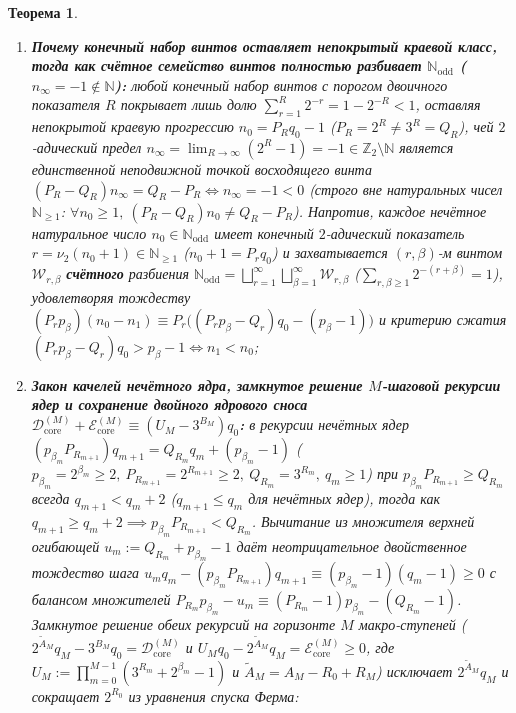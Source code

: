\documentclass[11pt,a4paper]{article}
\newtheorem{theorem}{Теорема}[section]
\theoremstyle{definition}
\theoremstyle{remark}
\begin{document}
\begin{theorem}
\begin{enumerate}[label=\textbf{(\roman*)},leftmargin=*,noitemsep]
  \[
    D_{\mathrm{tot}}\bigl(\mathcal{L}_1\mathbin{++}[(p_\beta,1,0),(P_R,Q_R,Q_R-P_R)]\mathbin{++}\mathcal{L}_2\bigr) - D_{\mathrm{tot}}\bigl(\mathcal{L}_1\mathbin{++}[(P_R,Q_R,Q_R-P_R),(p_\beta,1,0)]\mathbin{++}\mathcal{L}_2\bigr) \;\equiv\; P_{\mathrm{tot}}(\mathcal{L}_1)\cdot(p_\beta-1)(Q_R-P_R)\cdot Q_{\mathrm{tot}}(\mathcal{L}_2);
  \]
\item \textbf{Почему конечный набор винтов оставляет непокрытый краевой класс, тогда как счётное семейство винтов полностью разбивает $\mathbb{N}_{\mathrm{odd}}$ ($n_\infty = -1 \notin \mathbb{N}$):}
  любой конечный набор винтов с порогом двоичного показателя $R$ покрывает лишь долю $\sum_{r=1}^R 2^{-r} = 1 - 2^{-R} < 1$, оставляя непокрытой краевую прогрессию $n_0 = P_R q_0 - 1$ ($P_R = 2^R \ne 3^R = Q_R$), чей $2$-адический предел $n_\infty = \lim_{R\to\infty}(2^R - 1) = -1 \in \mathbb{Z}_2\setminus\mathbb{N}$ является единственной неподвижной точкой восходящего винта $(P_R - Q_R)n_\infty = Q_R - P_R \iff n_\infty = -1 < 0$ (строго вне натуральных чисел $\mathbb{N}_{\ge 1}$: $\forall n_0 \ge 1,\ (P_R - Q_R)n_0 \ne Q_R - P_R$). Напротив, каждое нечётное натуральное число $n_0 \in \mathbb{N}_{\mathrm{odd}}$ имеет конечный $2$-адический показатель $r = \nu_2(n_0 + 1) \in \mathbb{N}_{\ge 1}$ ($n_0 + 1 = P_r q_0$) и захватывается $(r,\beta)$-м винтом $\mathcal{W}_{r,\beta}$ \textbf{счётного} разбиения $\mathbb{N}_{\mathrm{odd}} = \bigsqcup_{r=1}^\infty\bigsqcup_{\beta=1}^\infty \mathcal{W}_{r,\beta}$ ($\sum_{r,\beta\ge 1} 2^{-(r+\beta)} = 1$), удовлетворяя тождеству $(P_r p_\beta)(n_0 - n_1) \equiv P_r\bigl((P_r p_\beta - Q_r)q_0 - (p_\beta - 1)\bigr)$ и критерию сжатия $(P_r p_\beta - Q_r)q_0 > p_\beta - 1 \iff n_1 < n_0$;
\item \textbf{Закон качелей нечётного ядра, замкнутое решение $M$-шаговой рекурсии ядер и сохранение двойного ядрового сноса $\mathcal{D}_{\mathrm{core}}^{(M)} + \mathcal{E}_{\mathrm{core}}^{(M)} \equiv (U_M - 3^{B_M})q_0$:}
  в рекурсии нечётных ядер $(p_{\beta_m} P_{R_{m+1}}) q_{m+1} = Q_{R_m} q_m + (p_{\beta_m} - 1)$ ($p_{\beta_m} = 2^{\beta_m}\ge 2,\ P_{R_{m+1}} = 2^{R_{m+1}}\ge 2,\ Q_{R_m} = 3^{R_m},\ q_m\ge 1$) при $p_{\beta_m} P_{R_{m+1}} \ge Q_{R_m}$ всегда $q_{m+1} < q_m + 2$ ($q_{m+1} \le q_m$ для нечётных ядер), тогда как $q_{m+1} \ge q_m + 2 \implies p_{\beta_m} P_{R_{m+1}} < Q_{R_m}$. Вычитание из множителя верхней огибающей $u_m := Q_{R_m} + p_{\beta_m} - 1$ даёт неотрицательное двойственное тождество шага $u_m q_m - (p_{\beta_m} P_{R_{m+1}}) q_{m+1} \equiv (p_{\beta_m} - 1)(q_m - 1) \ge 0$ с балансом множителей $P_{R_m} p_{\beta_m} - u_m \equiv (P_{R_m} - 1)p_{\beta_m} - (Q_{R_m} - 1)$. Замкнутое решение обеих рекурсий на горизонте $M$ макро-ступеней ($2^{\widetilde{A}_M} q_M - 3^{B_M} q_0 = \mathcal{D}_{\mathrm{core}}^{(M)}$ и $U_M q_0 - 2^{\widetilde{A}_M} q_M = \mathcal{E}_{\mathrm{core}}^{(M)} \ge 0$, где $U_M := \prod_{m=0}^{M-1}(3^{R_m} + 2^{\beta_m} - 1)$ и $\widetilde{A}_M = A_M - R_0 + R_M$) исключает $2^{\widetilde{A}_M} q_M$ и сокращает $2^{R_0}$ из уравнения спуска Ферма:

\end{enumerate}
\end{theorem}
\end{document}
